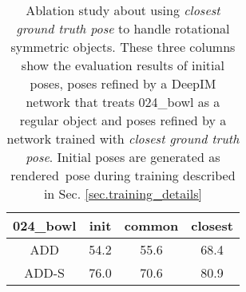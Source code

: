 \documentclass[twocolumn]{svjour3}
\newcommand{\rend}[0]{rendered}
\begin{document}
\begin{table}[t]
    \centering
    \begin{tabular}{c|c|c|c}
    \hline
024\_bowl & init & common & closest \\
\hline
ADD & 54.2 & 55.6 & 68.4 \\
ADD-S & 76.0 & 70.6 & 80.9 \\
\hline
\end{tabular}
    \caption{Ablation study about using \textit{closest ground truth pose} to handle rotational symmetric objects. These three columns show the evaluation results of initial poses, poses refined by a DeepIM network that treats 024\_bowl as a regular object and poses refined by a network trained with \textit{closest ground truth pose}. Initial poses are generated as \rend~pose during training described in Sec. \ref{sec.training_details}}
    \label{table.ablation_on_symmetry}
\end{table}
\end{document}
